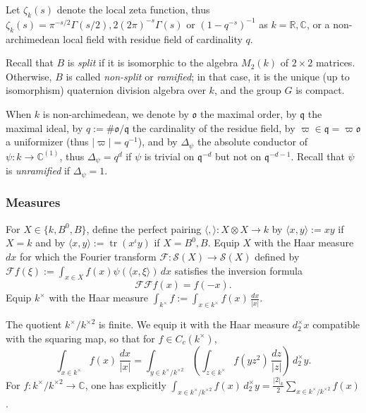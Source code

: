 \documentclass[reqno,10pt]{amsart}
\theoremstyle{plain} %
\theoremstyle{definition}
\theoremstyle{plain} %
\theoremstyle{remark}
\theoremstyle{itplain} %
\theoremstyle{remark} %
\numberwithin{equation}{section}
\DeclareMathOperator{\tr}{tr}
\begin{document}
Let $\zeta_k(s)$ denote the local zeta function, thus $\zeta_k(s) = \pi^{-s/2} \Gamma(s/2), 2 (2 \pi)^{-s} \Gamma(s)$ or $(1-q^{-s})^{-1}$ as $k = \mathbb{R}, \mathbb{C}$, or a non-archimedean local field with residue field of cardinality $q$.

Recall that $B$ is \emph{split} if it is isomorphic to the algebra $M_2(k)$ of $2 \times 2$ matrices.  Otherwise, $B$ is called \emph{non-split} or \emph{ramified}; in that case, it is the unique (up to isomorphism) quaternion division algebra over $k$, and the group $G$ is compact.

When $k$ is non-archimedean, we denote by $\mathfrak{o}$ the maximal order, by $\mathfrak{q}$ the maximal ideal, by $q := \# \mathfrak{o} / \mathfrak{q}$ the cardinality of the residue field, by $\varpi \in \mathfrak{q} = \varpi \mathfrak{o}$ a uniformizer (thus $|\varpi| = q^{-1}$), and by $\Delta_{\psi}$ the absolute conductor of $\psi : k \rightarrow \mathbb{C}^{(1)}$, thus $\Delta_{\psi} = q^d$ if $\psi$ is trivial on $\mathfrak{q}^{-d}$ but not on $\mathfrak{q}^{-d-1}$.  Recall that $\psi$ is \emph{unramified} if $\Delta_{\psi} = 1$.

\subsubsection{Measures\label{sec:local-measures}}
\label{sec-2-1-2}
For $X \in \{k,B^0,B\}$, define the perfect pairing $\langle , \rangle : X \otimes X \rightarrow k$ by $\langle x,y \rangle := x y$ if $X = k$ and by $\langle x, y \rangle := \tr(x^{\iota} y)$ if $X = B^0,B$.  Equip $X$ with the Haar measure $d x$ for which the Fourier transform $\mathcal{F} : \mathcal{S}(X) \rightarrow \mathcal{S}(X)$ defined by $\mathcal{F} f(\xi) := \int_{x \in X} f(x) \psi(\langle x, \xi \rangle) \, d x$ satisfies the inversion formula
\begin{equation}\label{eq:fourier-inversion-for-normalization}
  \mathcal{F} \mathcal{F} f(x) = f(-x).
\end{equation}
Equip $k^\times$ with the Haar measure $\int_{k^\times } f := \int_{x \in k^\times} f(x) \, \frac{d x}{|x|}$.

The quotient $k^\times / k^{\times 2}$ is finite.  We equip it with the Haar measure $d^\times_2 x$ compatible with the squaring map, so that for $f \in C_c(k^\times)$,
\begin{equation}\label{eqn:compatibility-squaring-map-local-measure}
  \int_{x \in k^\times}
  f(x)
  \,
  \frac{d x}{|x|}
  = 
  \int_{y \in k^\times/k^{\times 2}}
  \left(\int_{z \in k^\times}
  f(y z^2) \, \frac{d z}{|z|}\right) \, d _2^\times y.
\end{equation}
For $f : k^\times / k^{\times 2} \rightarrow \mathbb{C}$, one has explicitly $\int_{x \in k^\times / k^{\times 2}} f(x) \, d _2^\times y = \frac{|2|_k}{2} \sum_{x \in k^\times / k^{\times 2}} f(x)$.
\end{document}
